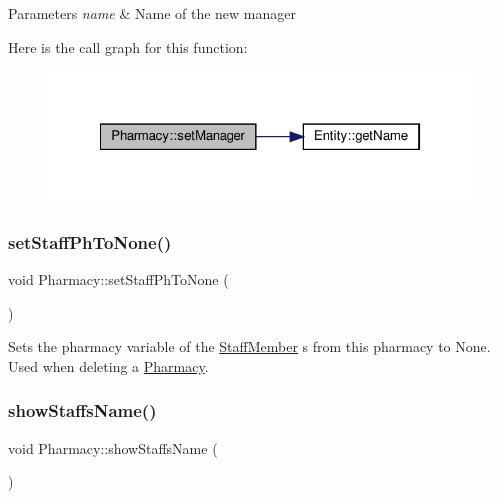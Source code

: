 \begin{DoxyParams}{Parameters}
{\em name} & Name of the new manager \\
\hline
\end{DoxyParams}
Here is the call graph for this function\+:\nopagebreak
\begin{figure}[H]
\begin{center}
\leavevmode
\includegraphics[width=322pt]{classPharmacy_a5c153e1ed72cfd0f824d43a1660c338d_cgraph}
\end{center}
\end{figure}
\mbox{\label{classPharmacy_abdc810233f809eeab66fce0d443f1ba8}} 
\subsubsection{\texorpdfstring{set\+Staff\+Ph\+To\+None()}{setStaffPhToNone()}}
{\footnotesize\ttfamily void Pharmacy\+::set\+Staff\+Ph\+To\+None (\begin{DoxyParamCaption}{ }\end{DoxyParamCaption})}



Sets the pharmacy variable of the \hyperlink{classStaffMember}{Staff\+Member} \textquotesingle{}s from this pharmacy to None. Used when deleting a \hyperlink{classPharmacy}{Pharmacy}. 

\mbox{\label{classPharmacy_addd2f907762d398ed28dba68eb4eaa66}} 
\subsubsection{\texorpdfstring{show\+Staffs\+Name()}{showStaffsName()}}
{\footnotesize\ttfamily void Pharmacy\+::show\+Staffs\+Name (\begin{DoxyParamCaption}{ }\end{DoxyParamCaption})}



